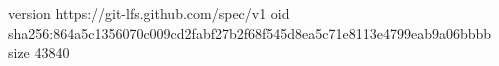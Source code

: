 version https://git-lfs.github.com/spec/v1
oid sha256:864a5c1356070c009cd2fabf27b2f68f545d8ea5c71e8113e4799eab9a06bbbb
size 43840
